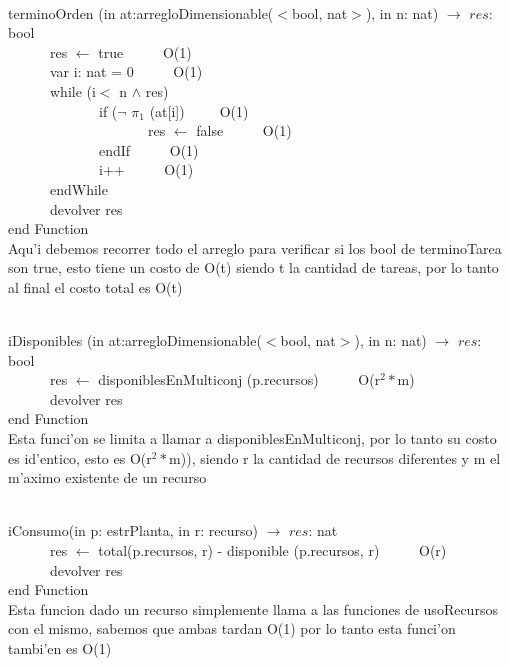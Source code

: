 \documentclass[a4paper,10pt]{article}
\begin{document}
\begin{algoritmo}
\caption{}\\
  terminoOrden (in at:arregloDimensionable($<$bool, nat$>$), in n: nat) $\rightarrow$ $res$: bool \\
	\indent \ \ \ \ \ \ res $\gets$ true \ \ \ \ \  O(1)\\
	\indent \ \ \ \ \ \ var i: nat = 0 \ \ \ \ \ O(1)\\
	\indent \ \ \ \ \ \ while (i$<$ n $\wedge$ res)   \ \ \ \ \ \\
	\indent \ \ \ \ \ \ \ \ \ \ \ \ \ if ($\neg$ $\pi_1$ (at[i])\ \ \ \ \ O(1) \\
	\indent \ \ \ \ \ \ \ \ \ \ \ \ \ \ \ \ \ \ \ \ res $\gets$ false \ \ \ \ \ O(1) \\
	\indent \ \ \ \ \ \ \ \ \ \ \ \ \ endIf \ \ \ \ \ O(1) \\
	\indent \ \ \ \ \ \ \ \ \ \ \ \ \ i++ \ \ \ \ \ O(1)\\
	\indent \ \ \ \ \ \ endWhile \ \ \ \ \ \\
   	\indent \ \ \ \ \ \ devolver res    \\
   end Function \\

Aqu'i debemos recorrer todo el arreglo para verificar si los bool de terminoTarea son true, esto tiene un costo de O(t) siendo t la cantidad de tareas, por lo tanto al final el costo total es O(t)
\end{algoritmo}

\newpage

\begin{algoritmo}
\caption{}\\
  iDisponibles (in at:arregloDimensionable($<$bool, nat$>$), in n: nat) $\rightarrow$ $res$: bool \\
	\indent \ \ \ \ \ \  res $\gets$ disponiblesEnMulticonj (p.recursos)  \ \ \ \ \ O(r$^{2}*$m) \\ 
   	\indent \ \ \ \ \ \ devolver res    \\
   end Function \\

Esta funci'on se limita a llamar a disponiblesEnMulticonj, por lo tanto su costo es id'entico, esto es O(r$^{2}*$m)), siendo r la cantidad de recursos diferentes y m el m'aximo existente de un recurso
\end{algoritmo}


\begin{algoritmo}
\caption{}\\
  iConsumo(in p: estrPlanta, in r: recurso) $\rightarrow$ $res$: nat \\
	\indent \ \ \ \ \ \  res $\gets$ total(p.recursos, r) - disponible (p.recursos, r)  \ \ \ \ \ O(r)\\
	\indent \ \ \ \ \ \  devolver res    \\
   end Function \\

Esta funcion dado un recurso simplemente llama a las funciones de usoRecursos con el mismo, sabemos que ambas tardan O(1) por lo tanto esta funci'on tambi'en es O(1)
\end{algoritmo}
\end{document}

